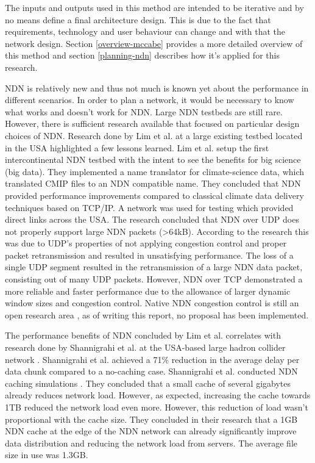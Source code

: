 The inputs and outputs used in this method are intended to be iterative and by no means define a final architecture design. This is due to the fact that requirements, technology and user behaviour can change and with that the network design. Section \ref{overview-mccabe} provides a more detailed overview of this method and section \ref{planning-ndn} describes how it's applied for this research.

NDN is relatively new and thus not much is known yet about the performance in different scenarios. In order to plan a network, it would be necessary to know what works and doesn't work for NDN. Large NDN testbeds are still rare. However, there is sufficient research available that focused on particular design choices of NDN. Research done by Lim et al. \cite{lim2018ndn} at a large existing testbed located in the USA \cite{ndn-testbed-status} highlighted a few lessons learned. Lim et al. setup the first intercontinental NDN testbed with the intent to see the benefits for big science (big data). They implemented a name translator for climate-science data, which translated CMIP files to an NDN compatible name. They concluded that NDN provided performance improvements compared to classical climate data delivery techniques based on TCP/IP. A network was used for testing which provided direct links across the USA. The research concluded that NDN over UDP does not properly support large NDN packets (\textgreater 64kB). According to the research this was due to UDP's properties of not applying congestion control and proper packet retransmission and resulted in unsatisfying performance. The loss of a single UDP segment resulted in the retransmission of a large NDN data packet, consisting out of many UDP packets. However, NDN over TCP demonstrated a more reliable and faster performance due to the allowance of larger dynamic window sizes and congestion control. Native NDN congestion control is still an open research area \cite{ren2016congestion}, as of writing this report, no proposal has been implemented.

The performance benefits of NDN concluded by Lim et al. correlates with research done by Shannigrahi et al. at the USA-based large hadron collider network \cite{shannigrahi2015named}. Shannigrahi et al. achieved a 71\% reduction in the average delay per data chunk compared to a no-caching case. Shannigrahi et al. conducted NDN caching simulations \cite{shannigrahi2017request}. They concluded that a small cache of several gigabytes already reduces network load. However, as expected, increasing the cache towards 1TB reduced the network load even more. However, this reduction of load wasn't proportional with the cache size. They concluded in their research that a 1GB NDN cache at the edge of the NDN network can already significantly improve data distribution and reducing the network load from servers. The average file size in use was 1.3GB.

